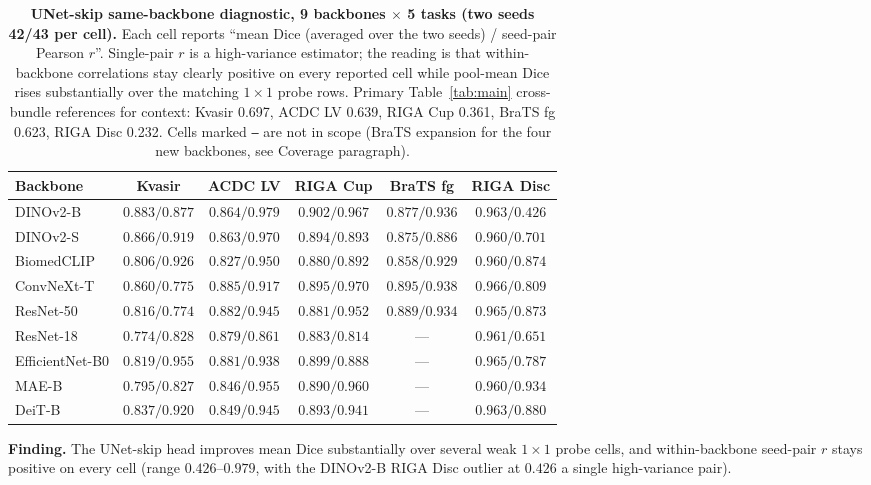 \begin{table}[!htbp]
  \caption{\textbf{UNet-skip same-backbone diagnostic, 9 backbones $\times$ 5 tasks (two seeds 42/43 per cell).} Each cell reports ``mean Dice (averaged over the two seeds) / seed-pair Pearson $r$''. Single-pair $r$ is a high-variance estimator; the reading is that within-backbone correlations stay clearly positive on every reported cell while pool-mean Dice rises substantially over the matching $1{\times}1$ probe rows. Primary Table~\ref{tab:main} cross-bundle references for context: Kvasir 0.697, ACDC LV 0.639, RIGA Cup 0.361, BraTS fg 0.623, RIGA Disc 0.232. Cells marked \texttt{---} are not in scope (BraTS expansion for the four new backbones, see Coverage paragraph).}
  \label{tab:unet}
  \centering\scriptsize
  \setlength{\tabcolsep}{2.5pt}
  \begin{tabular*}{\linewidth}{@{\extracolsep{\fill}}lccccc}
    \toprule
    Backbone & Kvasir & ACDC LV & RIGA Cup & BraTS fg & RIGA Disc \\
    \midrule
    DINOv2-B        & $0.883/0.877$ & $0.864/0.979$ & $0.902/0.967$ & $0.877/0.936$ & $0.963/0.426$ \\
    DINOv2-S        & $0.866/0.919$ & $0.863/0.970$ & $0.894/0.893$ & $0.875/0.886$ & $0.960/0.701$ \\
    BiomedCLIP      & $0.806/0.926$ & $0.827/0.950$ & $0.880/0.892$ & $0.858/0.929$ & $0.960/0.874$ \\
    ConvNeXt-T      & $0.860/0.775$ & $0.885/0.917$ & $0.895/0.970$ & $0.895/0.938$ & $0.966/0.809$ \\
    ResNet-50       & $0.816/0.774$ & $0.882/0.945$ & $0.881/0.952$ & $0.889/0.934$ & $0.965/0.873$ \\
    \addlinespace
    ResNet-18       & $0.774/0.828$ & $0.879/0.861$ & $0.883/0.814$ & ---           & $0.961/0.651$ \\
    EfficientNet-B0 & $0.819/0.955$ & $0.881/0.938$ & $0.899/0.888$ & ---           & $0.965/0.787$ \\
    MAE-B           & $0.795/0.827$ & $0.846/0.955$ & $0.890/0.960$ & ---           & $0.960/0.934$ \\
    DeiT-B          & $0.837/0.920$ & $0.849/0.945$ & $0.893/0.941$ & ---           & $0.963/0.880$ \\
    \bottomrule
  \end{tabular*}
\end{table}

\textbf{Finding.} The UNet-skip head improves mean Dice substantially over several weak $1{\times}1$ probe cells, and within-backbone seed-pair $r$ stays positive on every cell (range $0.426$--$0.979$, with the DINOv2-B RIGA Disc outlier at $0.426$ a single high-variance pair).

